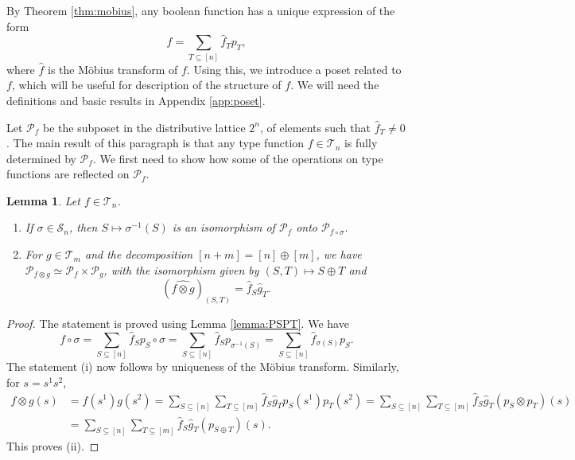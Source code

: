 \documentclass[12pt]{article}
\newtheorem{lemma}{Lemma}
\theoremstyle{definition}
\theoremstyle{remark}
\def\Te{\mathcal T}
\def\Pe{\mathcal P}
\def\permut{\mathscr{S}}
\begin{document}


By Theorem \ref{thm:mobius}, any boolean function has a unique expression of the form
\[
f=\sum_{T\subseteq [n]} \hat f_Tp_T,
\]
where $\hat f$ is the M\"obius transform of $f$. Using this, we introduce a poset related
to $f$, which will be useful for description of the structure of $f$. We will need the
definitions and basic results in Appendix \ref{app:poset}.

Let $\mathcal P_f$ be the subposet in the
distributive lattice $2^n$,  of elements such that
$\hat f_T\ne 0$. The main result of this paragraph is that any type function $f\in \Te_n$ is fully determined by $\Pe_f$.  
We first need to show how some of the operations on type functions are reflected on  $\Pe_f$.

\begin{lemma}\label{lemma:Pf} Let $f\in \Te_n$.
\begin{enumerate}

\item[(i)] If $\sigma\in \permut_n$, then $S\mapsto \sigma^{-1}(S)$ is an isomorphism of
$\Pe_{f}$ onto $\Pe_{f\circ\sigma}$.
\item[(ii)] For $g\in \Te_m$ and the decomposition $[n+m]=[n]\oplus [m]$, we have
$\Pe_{f\otimes g}\simeq \Pe_{f}\times \Pe_g$, with the isomorphism given by $(S,T)\mapsto
S\oplus T$ and 
\[
(\widehat{f\otimes g})_{(S,T)} =\hat f_S\hat g_T.
\]

\end{enumerate}


\end{lemma}

\begin{proof} The statement is proved using Lemma \ref{lemma:PSPT}.  We have
\[
f\circ \sigma=\sum_{S\subseteq [n]} \hat f_S p_S\circ\sigma=\sum_{S\subseteq [n]} \hat
f_Sp_{\sigma^{-1}(S)}=\sum_{S\subseteq [n]} \hat
f_{\sigma(S)}p_{S}.
\]
The statement (i) now follows by uniqueness of the M\"obius transform. Similarly, for
$s=s^1s^2$,
\begin{align*}
f\otimes g(s)&=f(s^1)g(s^2)=\sum_{S\subseteq [n]}\sum_{T\subseteq [m]} \hat f_S\hat
g_Tp_S(s^1)p_T(s^2)=\sum_{S\subseteq [n]}\sum_{T\subseteq [m]} \hat f_S\hat
g_T(p_S\otimes p_T)(s)\\
&= \sum_{S\subseteq [n]}\sum_{T\subseteq [m]} \hat f_S\hat
g_T(p_{S\oplus T})(s).
\end{align*}
This proves (ii).





\end{proof}
\end{document}
